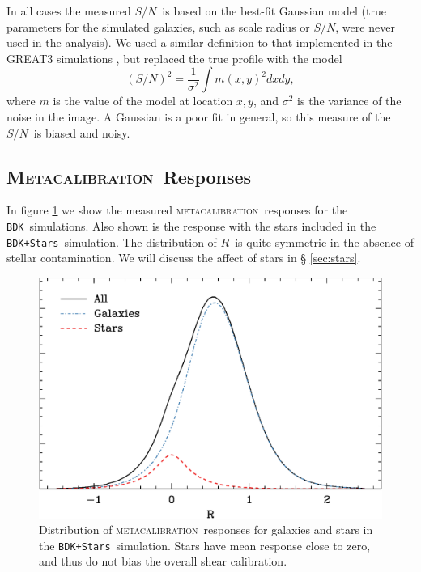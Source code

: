 \documentclass[iop, twocolappendix, appendixfloats, numberedappendix, apj]{emulateapj}
\newcommand{\snr}{$S/N$}
\newcommand{\mcal}{\textsc{metacalibration}}
\newcommand{\Mcal}{\textsc{Metacalibration}}
\newcommand{\mcalR}{\mbox{\boldmath $R$}}
\newcommand{\bdksim}{\texttt{BDK}}
\newcommand{\bdstar}{\texttt{BDK+Stars}}
\begin{document}
In all cases the measured \snr\ is based on the best-fit Gaussian model (true
parameters for the simulated galaxies, such as scale radius or \snr, were never
used in the analysis).  We used a similar definition to that implemented in the
GREAT3 simulations \citep[][equation 16]{great3}, but replaced the true profile
with the model
\begin{equation}
    (S/N)^2 = \frac{1}{\sigma^2} \int m(x,y)^2 dx dy,
\end{equation}
where $m$ is the value of the model at location $x,y$, and $\sigma^2$ is the
variance of the noise in the image. A Gaussian is a poor fit in general, so
this measure of the \snr\ is biased and noisy.

\subsection{\Mcal\ Responses}

In figure \ref{fig:Rstars} we show the measured \mcal\ responses for the
\bdksim\  simulations.  Also shown is the response with the stars included in
the \bdstar\ simulation.  The distribution of \mcalR\ is quite symmetric in the
absence of stellar contamination.  We will discuss the affect of stars in \S
\ref{sec:stars}.

\begin{figure}[h]
    \centering
    \includegraphics[width=\columnwidth]{R-bdj03-bdj03stars.eps}

    \caption{Distribution of \mcal\ responses for galaxies and stars in
    the \bdstar\ simulation.  Stars have mean response close to zero,
    and thus do not bias the overall shear calibration.}

\label{fig:Rstars}
\end{figure}
\end{document}

